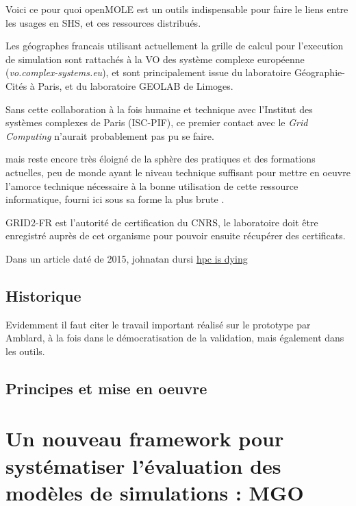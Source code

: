 Voici ce pour quoi openMOLE est un outils indispensable pour faire le liens entre les usages en SHS, et ces ressources distribués.

Les géographes francais utilisant actuellement la grille de calcul pour l'execution de simulation sont rattachés à la VO des système complexe européenne (\textit{vo.complex-systems.eu}), et sont principalement issue du laboratoire Géographie-Cités à Paris, et du laboratoire GEOLAB de Limoges.

Sans cette collaboration à la fois humaine et technique avec l'Institut des systèmes complexes de Paris (ISC-PIF), ce premier contact avec le \textit{Grid Computing} n'aurait probablement pas pu se faire.

 mais reste encore très éloigné de la sphère des pratiques et des formations actuelles, peu de monde ayant le niveau technique suffisant pour mettre en oeuvre l'amorce technique nécessaire à la bonne utilisation de cette ressource informatique, fourni ici sous sa forme la plus brute . 

 GRID2-FR est l'autorité de certification du CNRS, le laboratoire doit être enregistré auprès de cet organisme pour pouvoir ensuite récupérer des certificats.


Dans un article daté de 2015, johnatan dursi 
\href{http://www.dursi.ca/hpc-is-dying-and-mpi-is-killing-it/}{hpc is dying}

\subsection{Historique}

Evidemment il faut citer le travail important réalisé sur le prototype par Amblard, à la fois dans le démocratisation de la validation, mais également dans les outils.

\subsection{Principes et mise en oeuvre}

\section{Un nouveau framework pour systématiser l'évaluation des modèles de simulations : MGO}
\label{sec:MGO}

